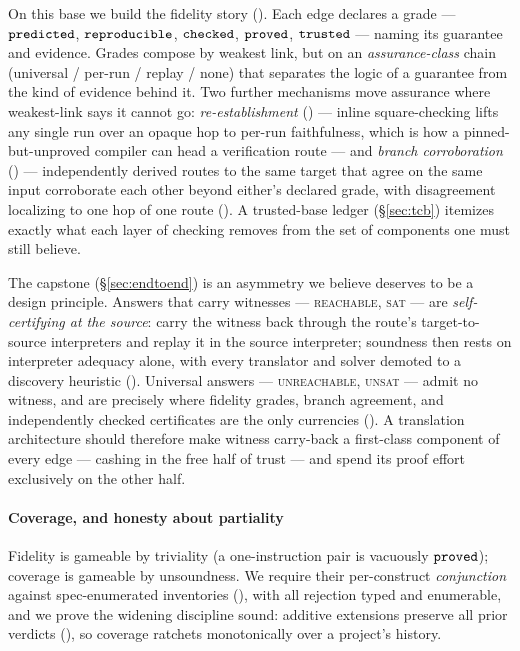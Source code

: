 On this base we build the fidelity story (). Each edge
declares a grade --- $\mathtt{predicted}$, $\mathtt{reproducible}$, $\mathtt{checked}$, $\mathtt{proved}$, $\mathtt{trusted}$ ---
naming its guarantee and evidence. Grades compose by weakest link, but on
an \emph{assurance-class} chain (universal / per-run / replay / none)
that separates the logic of a guarantee from the kind of evidence behind
it. Two further mechanisms move assurance where weakest-link says it
cannot go: \emph{re-establishment} () --- inline
square-checking lifts any single run over an opaque hop to per-run
faithfulness, which is how a pinned-but-unproved compiler can head a
verification route --- and \emph{branch corroboration}
() --- independently derived routes to the same target
that agree on the same input corroborate each other beyond either's
declared grade, with disagreement localizing to one hop of one route
(). A trusted-base ledger (\S\ref{sec:tcb}) itemizes
exactly what each layer of checking removes from the set of components
one must still believe.

The capstone (\S\ref{sec:endtoend}) is an asymmetry we believe deserves
to be a design principle. Answers that carry witnesses ---
\textsc{reachable}, \textsc{sat} --- are \emph{self-certifying at the
source}: carry the witness back through the route's target-to-source
interpreters and replay it in the source interpreter; soundness then
rests on interpreter adequacy alone, with every translator and solver
demoted to a discovery heuristic (). Universal
answers --- \textsc{unreachable}, \textsc{unsat} --- admit no witness,
and are precisely where fidelity grades, branch agreement, and
independently checked certificates are the only currencies
(). A translation architecture should therefore make
witness carry-back a first-class component of every edge --- cashing in
the free half of trust --- and spend its proof effort exclusively on the
other half.

\paragraph{Coverage, and honesty about partiality}
Fidelity is gameable by triviality (a one-instruction pair is vacuously
$\mathtt{proved}$); coverage is gameable by unsoundness. We require their
per-construct \emph{conjunction} against spec-enumerated inventories
(), with all rejection typed and enumerable, and we
prove the widening discipline sound: additive extensions preserve all
prior verdicts (), so coverage ratchets monotonically
over a project's history.

